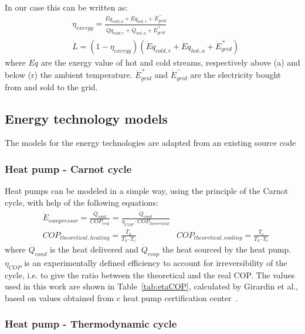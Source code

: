 \documentclass{article}
\begin{document}
In our case this can be written as:
\begin{align}
    & \eta_{exergy} =  \frac{\dot{E}q_{cold,a} + \dot{E}q_{hot,r} + \dot{E}_{grid}^{-}}{\dot{Q}q_{cold,r} + \dot{Q}_{hot,a} + \dot{E}_{grid}^{+}}  \\
    & \dot{L} = (1-\eta_{exergy})(\dot{E}q_{cold,r} + \dot{E}q_{hot,a} + \dot{E}_{grid}^{+})
\end{align}
where $\dot{E}q$ are the exergy value of hot and cold streams, respectively above (a) and below (r) the ambient temperature. $\dot{E}_{grid}^{+}$ and $\dot{E}_{grid}^{-}$ are the electricity bought from and sold to the grid.

\subsection{Energy technology models}\label{ss:et}
The models for the energy technologies are adapted from an existing source code~\cite{suciuEnergyautonomousCitiesUsing2016}

\subsubsection{Heat pump - Carnot cycle}\label{sss:hp_carnot}
Heat pumps can be modeled in a simple way, using the principle of the Carnot cycle, with help of the following equations:
\begin{align}
    & \dot{E}_{compressor} = \frac{\dot{Q}_{cond}}{COP_{real}} = \frac{\dot{Q}_{cond}}{\eta_{COP} \cdot COP_{theoretical}} \\
    & COP_{theoretical, heating} =  \frac{T_{h}}{T_{h} – T_{c}}  
    & COP_{theoretical, cooling} =  \frac{T_{c}}{T_{h} – T_{c}} 
\end{align}
where $\dot{Q}_{cond}$ is the heat delivered and $\dot{Q}_{evap}$ the heat sourced by the heat pump. $\eta_{COP}$ is an experimentally defined efficiency to account for irreversibility of the cycle, i.e. to give the ratio between the theoretical and the real COP. The values used in this work are shown in Table~\ref{tab:etaCOP}, calculated by Girardin et al.\cite{girardinEnerGisGeographicalInformation2010}, based on values obtained from c heat pump certification center~\cite{NTBBuchsInstitut}. \\



\subsubsection{Heat pump - Thermodynamic cycle}\label{sss:hp_thermo}
\end{document}
